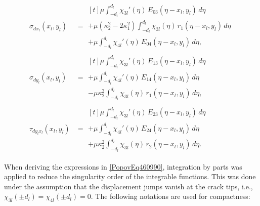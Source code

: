 \begin{equation} \label{PopovEq460990} 
	\begin{aligned} 
		\sigma_{dx_{l}}(x_{l}, y_{l}) &=
		\begin{multlined}[t]
			\mu \int_{-d_{l}}^{d_{l}} \chi_{3l}'(\eta)\, E_{03}(\eta - x_{l}, y_{l})\, d\eta 
			\\
			+ \mu (\kappa_2^2 - 2\kappa_1^2) \int_{-d_{l}}^{d_{l}} \chi_{3l}(\eta)\, r_1(\eta - x_{l}, y_{l})\, d\eta 
			\\
			+ \mu \int_{-d_{l}}^{d_{l}} \chi_{4l}'(\eta)\, E_{04}(\eta - x_{l}, y_{l})\, d\eta,
		\end{multlined}
		\\[0.5em]
		\sigma_{dy_{l}}(x_{l}, y_{l}) &=
		\begin{multlined}[t]
			\mu \int_{-d_{l}}^{d_{l}} \chi_{3l}'(\eta)\, E_{13}(\eta - x_{l}, y_{l})\, d\eta 
			\\
			+ \mu \int_{-d_{l}}^{d_{l}} \chi_{4l}'(\eta)\, E_{14}(\eta - x_{l}, y_{l})\, d\eta 
			\\
			- \mu \kappa_2^2 \int_{-d_{l}}^{d_{l}} \chi_{3l}(\eta)\, r_1(\eta - x_{l}, y_{l})\, d\eta,
		\end{multlined}
		\\[0.5em]
		\tau_{dy_{l} x_{l}}(x_{l}, y_{l}) &=
		\begin{multlined}[t]
			\mu \int_{-d_{l}}^{d_{l}} \chi_{3l}'(\eta)\, E_{23}(\eta - x_{l}, y_{l})\, d\eta 
			\\
			+ \mu \int_{-d_{l}}^{d_{l}} \chi_{4l}'(\eta)\, E_{24}(\eta - x_{l}, y_{l})\, d\eta 
			\\
			+ \mu \kappa_2^2 \int_{-d_{l}}^{d_{l}} \chi_{3l}(\eta)\, r_2(\eta - x_{l}, y_{l})\, d\eta.
		\end{multlined}
	\end{aligned}
\end{equation}

When deriving the expressions in \eqref{PopovEq460990}, integration by parts was applied to reduce the singularity order of the integrable functions. This was done under the assumption that the displacement jumps vanish at the crack tips, i.e., \( \chi_{3l}(\pm d_{l}) = \chi_{4l}(\pm d_{l}) = 0 \). The following notations are used for compactness:



